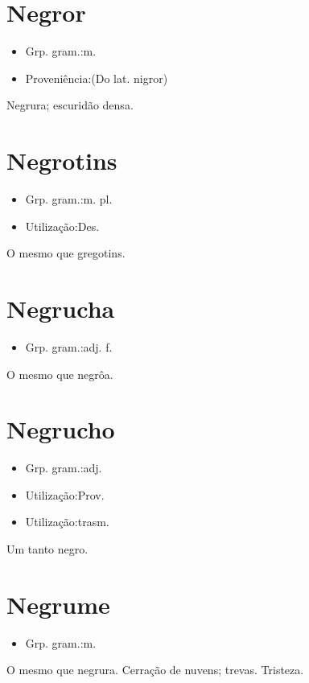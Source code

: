 \section{Negror}
\begin{itemize}
\item {Grp. gram.:m.}
\end{itemize}
\begin{itemize}
\item {Proveniência:(Do lat. \textunderscore nigror\textunderscore )}
\end{itemize}
Negrura; escuridão densa.
\section{Negrotins}
\begin{itemize}
\item {Grp. gram.:m. pl.}
\end{itemize}
\begin{itemize}
\item {Utilização:Des.}
\end{itemize}
O mesmo que \textunderscore gregotins\textunderscore .
\section{Negrucha}
\begin{itemize}
\item {Grp. gram.:adj. f.}
\end{itemize}
O mesmo que \textunderscore negrôa\textunderscore .
\section{Negrucho}
\begin{itemize}
\item {Grp. gram.:adj.}
\end{itemize}
\begin{itemize}
\item {Utilização:Prov.}
\end{itemize}
\begin{itemize}
\item {Utilização:trasm.}
\end{itemize}
Um tanto negro.
\section{Negrume}
\begin{itemize}
\item {Grp. gram.:m.}
\end{itemize}
O mesmo que \textunderscore negrura\textunderscore .
Cerração de nuvens; trevas.
Tristeza.

